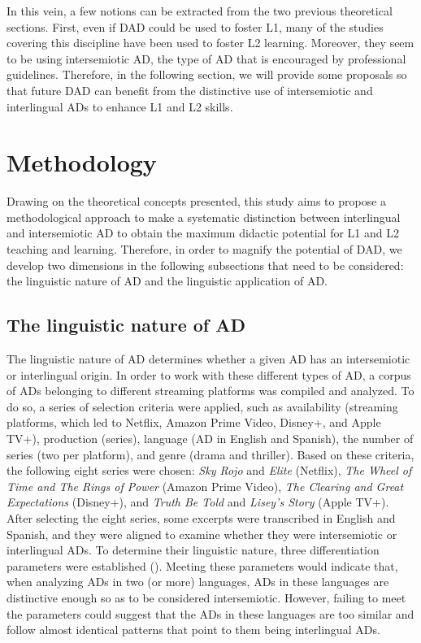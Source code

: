 \documentclass[english]{textolivre}
\begin{document}
In this vein, a few notions can be extracted from the two previous theoretical sections. First, even if DAD could be used to foster L1, many of the studies covering this discipline have been used to foster L2 learning. Moreover, they seem to be using intersemiotic AD, the type of AD that is encouraged by professional guidelines. Therefore, in the following section, we will provide some proposals so that future DAD can benefit from the distinctive use of intersemiotic and interlingual ADs to enhance L1 and L2 skills.


\section{Methodology}\label{sec-fmt-manuscrito}
Drawing on the theoretical concepts presented, this study aims to propose a methodological approach to make a systematic distinction between interlingual and intersemiotic AD to obtain the maximum didactic potential for L1 and L2 teaching and learning. Therefore, in order to magnify the potential of DAD, we develop two dimensions in the following subsections that need to be considered: the linguistic nature of AD and the linguistic application of AD.


\subsection{The linguistic nature of AD}\label{sec-formato}
The linguistic nature of AD determines whether a given AD has an intersemiotic or interlingual origin. In order to work with these different types of AD, a corpus of ADs belonging to different streaming platforms was compiled and analyzed. To do so, a series of selection criteria were applied, such as availability (streaming platforms, which led to Netflix, Amazon Prime Video, Disney+, and Apple TV+), production (series), language (AD in English and Spanish), the number of series (two per platform), and genre (drama and thriller). Based on these criteria, the following eight series were chosen: \textit{Sky Rojo} and \textit{Elite} (Netflix), \textit{The Wheel of Time and The Rings of Power} (Amazon Prime Video), \textit{The Clearing and Great Expectations} (Disney+), and \textit{Truth Be Told} and \textit{Lisey’s Story} (Apple TV+). After selecting the eight series, some excerpts were transcribed in English and Spanish, and they were aligned to examine whether they were intersemiotic or interlingual ADs. To determine their linguistic nature, three differentiation parameters were established (). Meeting these parameters would indicate that, when analyzing ADs in two (or more) languages, ADs in these languages are distinctive enough so as to be considered intersemiotic. However, failing to meet the parameters could suggest that the ADs in these languages are too similar and follow almost identical patterns that point to them being interlingual ADs.
\end{document}

